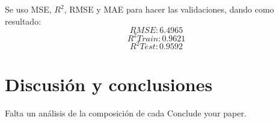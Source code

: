 \documentclass[conference]{IEEEtran} %
\begin{document}
Se uso MSE, $R^2$, RMSE y MAE para hacer las validaciones, dando como resultado:
$$RMSE: 6.4965$$
$$R^2 Train: 0.9621$$
$$R^2 Test: 0.9592$$





\section{Discusión y conclusiones}

Falta un análisis de la composición de cada 
Conclude your paper.

\end{document}

